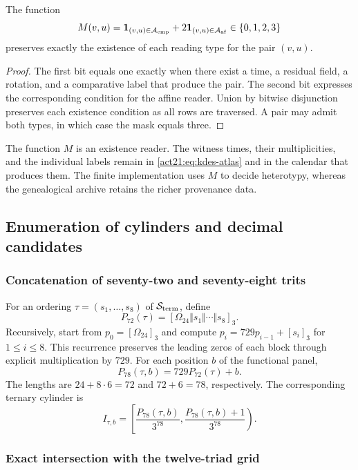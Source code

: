 \begin{proposition}
The function
\[
 M(v,u)=\mathbf1_{(v,u)\in\mathcal A_{\rm cmp}}
        +2\mathbf1_{(v,u)\in\mathcal A_{\rm af}}
        \in\{0,1,2,3\}
\]
preserves exactly the existence of each reading type for the pair
$(v,u)$.
\end{proposition}
\begin{proof}
The first bit equals one exactly when there exist a time, a residual
field, a rotation, and a comparative label that produce the pair.
The second bit expresses the corresponding condition for the affine reader.
Union by bitwise disjunction preserves each existence condition
as all rows are traversed. A pair may admit both types, in which
case the mask equals three.
\end{proof}

The function $M$ is an existence reader. The witness times, their
multiplicities, and the individual labels remain in
\eqref{act21:eq:kdes-atlas} and in the calendar that produces them. The
finite implementation uses $M$ to decide heterotypy, whereas
the genealogical archive retains the richer provenance data.

\subsection{Enumeration of cylinders and decimal candidates}

\subsubsection{Concatenation of seventy-two and seventy-eight trits}

For an ordering $\tau=(s_1,\ldots,s_8)$ of
$\mathcal S_{\rm term}$, define
\[
 P_{72}(\tau)=[\Omega_{24}\Vert s_1\Vert\cdots\Vert s_8]_3.
\]
Recursively, start from $p_0=[\Omega_{24}]_3$ and compute
$p_i=729p_{i-1}+[s_i]_3$ for $1\leq i\leq8$. This recurrence
preserves the leading zeros of each block through explicit
multiplication by $729$. For each position $b$ of the functional panel,
\[
 P_{78}(\tau,b)=729P_{72}(\tau)+b.
\]
The lengths are $24+8\cdot6=72$ and $72+6=78$, respectively.
The corresponding ternary cylinder is
\begin{equation}
 I_{\tau,b}=
 \left[\frac{P_{78}(\tau,b)}{3^{78}},
       \frac{P_{78}(\tau,b)+1}{3^{78}}\right).
 \label{act21:eq:kdes-cilindro}
\end{equation}

\subsubsection{Exact intersection with the twelve-triad grid}

